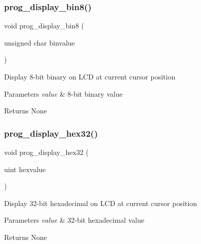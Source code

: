 \subsubsection{\texorpdfstring{prog\+\_\+display\+\_\+bin8()}{prog\_display\_bin8()}}
{\footnotesize\ttfamily void prog\+\_\+display\+\_\+bin8 (\begin{DoxyParamCaption}\item[{unsigned char}]{binvalue }\end{DoxyParamCaption})}

Display 8-\/bit binary on L\+CD at current cursor position 
\begin{DoxyParams}{Parameters}
{\em value} & 8-\/bit binary value \\
\hline
\end{DoxyParams}
\begin{DoxyReturn}{Returns}
None 
\end{DoxyReturn}
\mbox{\label{group__scaffolding_gae22b0332268122b8ef7443b7bc5024b9}} 
\subsubsection{\texorpdfstring{prog\+\_\+display\+\_\+hex32()}{prog\_display\_hex32()}}
{\footnotesize\ttfamily void prog\+\_\+display\+\_\+hex32 (\begin{DoxyParamCaption}\item[{uint}]{hexvalue }\end{DoxyParamCaption})}

Display 32-\/bit hexadecimal on L\+CD at current cursor position 
\begin{DoxyParams}{Parameters}
{\em value} & 32-\/bit hexadecimal value \\
\hline
\end{DoxyParams}
\begin{DoxyReturn}{Returns}
None 
\end{DoxyReturn}
\mbox{\label{group__scaffolding_ga0ea4957bdb462cada821c4d728494087}} 
